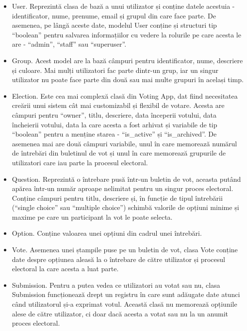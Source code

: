 \begin{itemize}
    \item User. Reprezintă clasa de bază a unui utilizator și conține datele acestuia - identificator, nume, prenume, email și grupul din care face parte. De asemenea, pe lângă aceste date, modelul User conține și structuri tip \enquote{boolean} pentru salvarea informațiilor cu vedere la rolurile pe care acesta le are - \enquote{admin}, \enquote{staff} sau \enquote{superuser}.
    \item Group. Acest model are la bază câmpuri pentru identificator, nume, descriere și culoare. Mai mulți utilizatori fac parte dintr-un grup, iar un singur utilizator nu poate face parte din două sau mai multe grupuri în același timp.
    \item Election. Este cea mai complexă clasă din Voting App, dat fiind necesitatea creării unui sistem cât mai customizabil și flexibil de votare. Acesta are câmpuri pentru \enquote{owner}, titlu, descriere, data începerii votului, data încheierii votului, data la care acesta a fost arhivat și variabile de tip \enquote{boolean} pentru a menține starea - \enquote{is\_active} și \enquote{is\_archived}. De asemenea mai are două câmpuri variabile, unul în care memorează numărul de întrebări din buletinul de vot și unul în care memorează grupurile de utilizatori care iau parte la procesul electoral.
    \item Question. Reprezintă o întrebare pusă într-un buletin de vot, aceasta putând apărea într-un număr aproape nelimitat pentru un singur proces electoral. Conține câmpuri pentru titlu, descriere și, în funcție de tipul întrebării (\enquote{single choice} sau \enquote{multiple choice}) schimbă valorile de opțiuni minime și maxime pe care un participant la vot le poate selecta.
    \item Option. Conține valoarea unei opțiuni din cadrul unei întrebări.
    \item Vote. Asemenea unei ștampile puse pe un buletin de vot, clasa Vote conține date despre opțiunea aleasă la o întrebare de către utilizator și procesul electoral la care acesta a luat parte.
    \item Submission. Pentru a putea vedea ce utilizatori au votat sau nu, clasa Submission funcționează drept un registru în care sunt adăugate date atunci când utilizatorul și-a exprimat votul. Această clasă nu memorează opțiunile alese de către utilizator, ci doar dacă acesta a votat sau nu la un anumit proces electoral.
\end{itemize}

